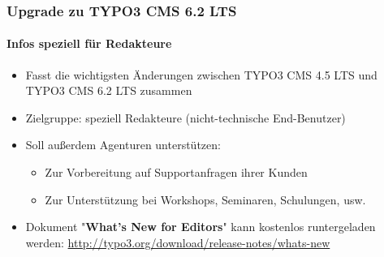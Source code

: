 \begin{frame}[fragile]
	\frametitle{Upgrade zu TYPO3 CMS 6.2 LTS}
	\framesubtitle{Infos speziell für Redakteure}

	\begin{itemize}
		\item Fasst die wichtigsten Änderungen zwischen TYPO3 CMS 4.5 LTS und TYPO3 CMS 6.2 LTS zusammen
		\item Zielgruppe: speziell Redakteure (nicht-technische End-Benutzer)
		\item Soll außerdem Agenturen unterstützen:

			\begin{itemize}
				\item Zur Vorbereitung auf Supportanfragen ihrer Kunden
				\item Zur Unterstützung bei Workshops, Seminaren, Schulungen, usw.
			\end{itemize}

		\item Dokument "\textbf{What's New for Editors}" kann kostenlos runtergeladen werden:\newline
			\smaller\url{http://typo3.org/download/release-notes/whats-new}\normalsize
	\end{itemize}

\end{frame}


